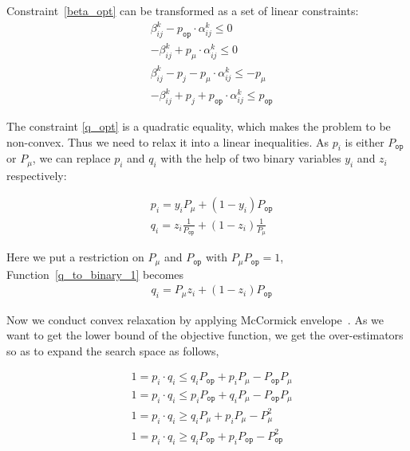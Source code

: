 \documentclass[times]{ettauth}
\theoremstyle{mytheoremstyle}
\theoremstyle{mytheoremstyle}
\theoremstyle{mytheoremstyle}
\begin{document}
	Constraint~\ref{beta_opt} can be transformed as a set of linear constraints:
		\begin{align}
			& \beta_{ij}^k - p_{\mathtt{op}}\cdot \alpha_{ij}^k \leq 0 \label{beta_linearization_1}\\
			& - \beta_{ij}^k + p_\mu\cdot \alpha_{ij}^k \leq 0 \label{beta_linearization_2}\\
			& \beta_{ij}^k - p_j - p_\mu\cdot \alpha_{ij}^k \leq -p_\mu \label{beta_linearization_3}\\			
			& -\beta_{ij}^k + p_j + p_{\mathtt{op}}\cdot \alpha_{ij}^k \leq p_{\mathtt{op}} \label{beta_linearization_4}
	\end{align}
	
	
	The constraint \ref{q_opt} is a quadratic equality, which makes the problem to be non-convex. 
	Thus we need to relax it into a linear inequalities.
	As $p_i$ is either $P_{\mathtt{op}}$ or $P_\mu$, we can replace $p_i$ and $q_i$ with the help of two binary variables $y_i$ and $z_i$ respectively:

	\begin{align}
	& p_i = y_i P_\mu + (1-y_i) P_{\mathtt{op}}\label{p_to_binary}	\\
	& q_i = z_i \frac{1}{P_{\mathtt{op}}} + (1-z_i)\frac{1}{P_\mu}\label{q_to_binary_1}
   \end{align}

Here we put a restriction on $P_\mu$ and $P_{\mathtt{op}}$ with $P_\mu P_{\mathtt{op}} = 1$, Function~\ref{q_to_binary_1} becomes
	\begin{align}
	& q_i = P_\mu z_i  + (1-z_i) P_{\mathtt{op}} \label{q_to_binary_2}
   \end{align}
	
Now we conduct convex relaxation by applying McCormick envelope~\cite{Mitsos2009McCormickBasedRO}.
As we want to get the lower bound of the objective function, we get the over-estimators so as to expand the search space as follows,

	\begin{align}
& 1 = p_i \cdot q_i  \leq q_i P_{\mathtt{op}} + p_i P_\mu - P_{\mathtt{op}}P_\mu\label{McCormick_envelope-1}	\\
& 1= p_i \cdot q_i   \leq p_i P_{\mathtt{op}} + q_i P_\mu - P_{\mathtt{op}}P_\mu\label{McCormick_envelope-2}\\
& 1= p_i \cdot q_i   \geq 	q_i P_\mu + p_i P_\mu - P_\mu^2\label{McCormick_envelope-3}\\
& 1= p_i \cdot q_i   \geq 	q_i P_{\mathtt{op}} + p_i P_{\mathtt{op}} - P_{\mathtt{op}}^2\label{McCormick_envelope-4}
	\end{align}
	
\end{document}
